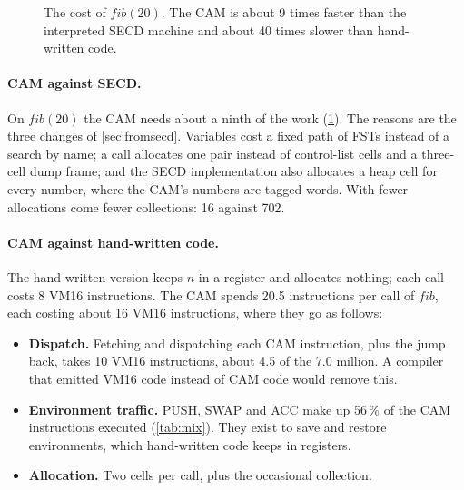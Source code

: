\documentclass[11pt,a4paper]{article}
\newcommand{\ins}[1]{\textsf{#1}}
\theoremstyle{definition}
\theoremstyle{plain}
\begin{document}
\begin{figure}[t]
\centering
{}
\caption{The cost of $\mathit{fib}(20)$. The CAM is about 9 times faster than
the interpreted SECD machine and about 40 times slower than hand-written
code.}
\label{fig:bars}
\end{figure}

\paragraph{CAM against SECD.} On $\mathit{fib}(20)$ the CAM needs about a
ninth of the work (\cref{fig:bars}). The reasons are the three changes of
\cref{sec:fromsecd}. Variables cost a fixed path of \ins{FST}s instead of a
search by name; a call allocates one pair instead of control-list cells and a
three-cell dump frame; and the SECD implementation also allocates a heap cell
for every number, where the CAM's numbers are tagged words. With fewer
allocations come fewer collections: 16 against 702.

\paragraph{CAM against hand-written code.} The hand-written version keeps $n$
in a register and allocates nothing; each call costs 8 VM16 instructions. The
CAM spends 20.5 instructions per call of $\mathit{fib}$, each costing about
16 VM16 instructions, where they go as follows:
\begin{itemize}[itemsep=2pt]
\item \textbf{Dispatch.} Fetching and dispatching each CAM instruction, plus
  the jump back, takes 10 VM16 instructions, about 4.5 of the 7.0 million.
  A compiler that emitted VM16 code instead of CAM code would remove this.
\item \textbf{Environment traffic.} \ins{PUSH}, \ins{SWAP} and \ins{ACC} make
  up 56\,\% of the CAM instructions executed (\cref{tab:mix}). They exist to
  save and restore environments, which hand-written code keeps in registers.
\item \textbf{Allocation.} Two cells per call, plus the occasional
  collection.
\end{itemize}
\end{document}
